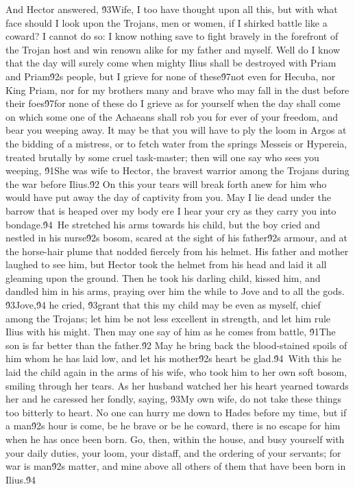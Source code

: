 {And Hector answered, \'93Wife, I too have thought upon all this, but with what face should I look upon the Trojans, men or women, if I shirked battle like a coward? I cannot do so: I know nothing save to fight bravely in the forefront of the Trojan host and win renown alike for my father and myself. Well do I know that the day will surely come when mighty Ilius shall be destroyed with Priam and Priam\'92s people, but I grieve for none of these\'97not even for Hecuba, nor King Priam, nor for my brothers many and brave who may fall in the dust before their foes\'97for none of these do I grieve as for yourself when the day shall come on which some one of the Achaeans shall rob you for ever of your freedom, and bear you weeping away. It may be that you will have to ply the loom in Argos at the bidding of a mistress, or to fetch water from the springs Messeis or Hypereia, treated brutally by some cruel task-master; then will one say who sees you weeping, \'91She was wife to Hector, the bravest warrior among the Trojans during the war before Ilius.\'92 On this your tears will break forth anew for him who would have put away the day of captivity from you. May I lie dead under the barrow that is heaped over my body ere I hear your cry as they carry you into bondage.\'94\
He stretched his arms towards his child, but the boy cried and nestled in his nurse\'92s bosom, scared at the sight of his father\'92s armour, and at the horse-hair plume that nodded fiercely from his helmet. His father and mother laughed to see him, but Hector took the helmet from his head and laid it all gleaming upon the ground. Then he took his darling child, kissed him, and dandled him in his arms, praying over him the while to Jove and to all the gods. \'93Jove,\'94 he cried, \'93grant that this my child may be even as myself, chief among the Trojans; let him be not less excellent in strength, and let him rule Ilius with his might. Then may one say of him as he comes from battle, \'91The son is far better than the father.\'92 May he bring back the blood-stained spoils of him whom he has laid low, and let his mother\'92s heart be glad.\'94\
With this he laid the child again in the arms of his wife, who took him to her own soft bosom, smiling through her tears. As her husband watched her his heart yearned towards her and he caressed her fondly, saying, \'93My own wife, do not take these things too bitterly to heart. No one can hurry me down to Hades before my time, but if a man\'92s hour is come, be he brave or be he coward, there is no escape for him when he has once been born. Go, then, within the house, and busy yourself with your daily duties, your loom, your distaff, and the ordering of your servants; for war is man\'92s matter, and mine above all others of them that have been born in Ilius.\'94\
}
